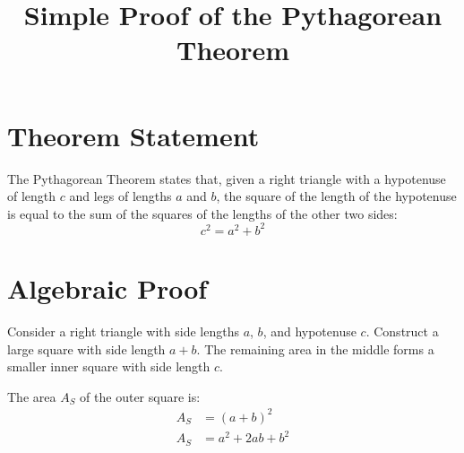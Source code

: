 \documentclass{article}
\begin{document}
\title{Simple Proof of the Pythagorean Theorem}
\author{}
\date{}
\maketitle

\section*{Theorem Statement}
The Pythagorean Theorem states that, given a right triangle with a hypotenuse of length \(c\) and legs of lengths \(a\) and \(b\), the square of the length of the hypotenuse is equal to the sum of the squares of the lengths of the other two sides:
\[
c^2 = a^2 + b^2
\]

\section*{Algebraic Proof}

Consider a right triangle with side lengths \(a\), \(b\), and hypotenuse \(c\). Construct a large square with side length \(a + b\).
The remaining area in the middle forms a smaller inner square with side length \(c\).

\begin{center}
\end{center}

The area \(A_S\) of the outer square is:
\begin{align}
A_S &= (a + b)^2 \\
A_S &= a^2 + 2ab + b^2
\end{align}
\end{document}
